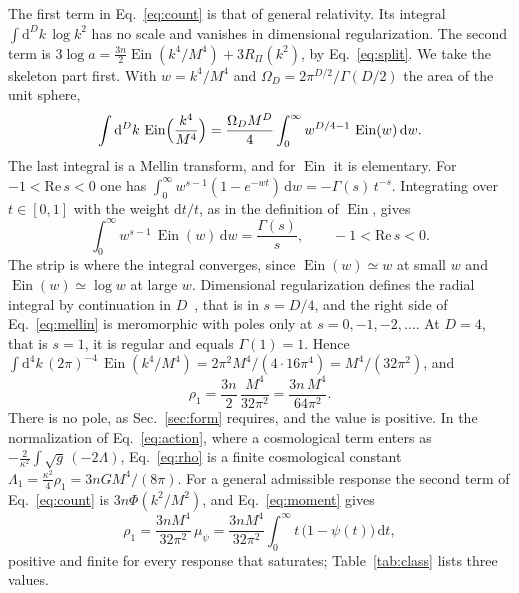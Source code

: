 \documentclass[aps,prd,10pt,twocolumn,superscriptaddress,nofootinbib,floatfix,longbibliography]{revtex4-2}
\newcommand{\dd}{\mathrm{d}}
\newcommand{\Ein}{\operatorname{Ein}}
\begin{document}
The first term in Eq.~\eqref{eq:count} is that of general relativity. Its integral $\int\dd^Dk\,\log k^2$ has no scale and vanishes in dimensional regularization. The second term is $3\log a=\frac{3n}2\Ein(k^4/M^4)+3R_\Pi(k^2)$, by Eq.~\eqref{eq:split}. We take the skeleton part first. With $w=k^4/M^4$ and $\Omega_D=2\pi^{D/2}/\Gamma(D/2)$ the area of the unit sphere,
\[
\int\dd^Dk\,\Ein\Bigl(\frac{k^4}{M^4}\Bigr)=\frac{\Omega_DM^D}4\int_0^\infty w^{D/4-1}\,\Ein(w)\,\dd w .
\]
The last integral is a Mellin transform, and for $\Ein$ it is elementary. For $-1<\mathrm{Re}\,s<0$ one has $\int_0^\infty w^{s-1}(1-e^{-wt})\,\dd w=-\Gamma(s)\,t^{-s}$. Integrating over $t\in[0,1]$ with the weight $\dd t/t$, as in the definition of $\Ein$, gives
\begin{equation}
\label{eq:mellin}
\int_0^\infty w^{s-1}\,\Ein(w)\,\dd w=\frac{\Gamma(s)}{s},\qquad -1<\mathrm{Re}\,s<0 .
\end{equation}
The strip is where the integral converges, since $\Ein(w)\simeq w$ at small $w$ and $\Ein(w)\simeq\log w$ at large $w$. Dimensional regularization defines the radial integral by continuation in $D$~\cite{Collins1984}, that is in $s=D/4$, and the right side of Eq.~\eqref{eq:mellin} is meromorphic with poles only at $s=0,-1,-2,\dots$. At $D=4$, that is $s=1$, it is regular and equals $\Gamma(1)=1$. Hence $\int\dd^4k\,(2\pi)^{-4}\,\Ein(k^4/M^4)=2\pi^2M^4/(4\cdot16\pi^4)=M^4/(32\pi^2)$, and
\begin{equation}
\label{eq:rho}
\rho_1=\frac{3n}{2}\,\frac{M^4}{32\pi^2}=\frac{3n\,M^4}{64\pi^2}.
\end{equation}
There is no pole, as Sec.~\ref{sec:form} requires, and the value is positive. In the normalization of Eq.~\eqref{eq:action}, where a cosmological term enters as $-\frac2{\kappa^2}\int\sqrt g\,(-2\Lambda)$, Eq.~\eqref{eq:rho} is a finite cosmological constant $\Lambda_1=\frac{\kappa^2}4\rho_1=3nGM^4/(8\pi)$. For a general admissible response the second term of Eq.~\eqref{eq:count} is $3n\Phi(k^2/M^2)$, and Eq.~\eqref{eq:moment} gives
\begin{equation}
\label{eq:rho-gen}
\rho_1=\frac{3nM^4}{32\pi^2}\,\mu_\psi=\frac{3nM^4}{32\pi^2}\int_0^\infty t\,\bigl(1-\psi(t)\bigr)\,\dd t ,
\end{equation}
positive and finite for every response that saturates; Table~\ref{tab:class} lists three values.
\end{document}
